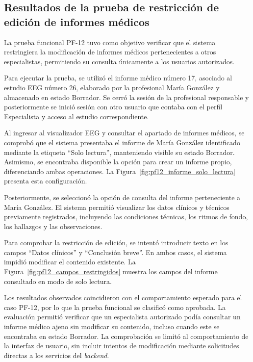 \subsection{Resultados de la prueba de restricción de edición de informes médicos}

La prueba funcional PF-12 tuvo como objetivo verificar que el sistema restringiera la modificación de informes médicos pertenecientes a otros especialistas, permitiendo su consulta únicamente a los usuarios autorizados.

Para ejecutar la prueba, se utilizó el informe médico número 17, asociado al estudio EEG número 26, elaborado por la profesional María González y almacenado en estado Borrador. Se cerró la sesión de la profesional responsable y posteriormente se inició sesión con otro usuario que contaba con el perfil Especialista y acceso al estudio correspondiente.

Al ingresar al visualizador EEG y consultar el apartado de informes médicos, se comprobó que el sistema presentaba el informe de María González identificado mediante la etiqueta ``Solo lectura'', manteniendo visible su estado Borrador. Asimismo, se encontraba disponible la opción para crear un informe propio, diferenciando ambas operaciones. La Figura~\ref{fig:pf12_informe_solo_lectura} presenta esta configuración.

Posteriormente, se seleccionó la opción de consulta del informe perteneciente a María González. El sistema permitió visualizar los datos clínicos y técnicos previamente registrados, incluyendo las condiciones técnicas, los ritmos de fondo, los hallazgos y las observaciones.

Para comprobar la restricción de edición, se intentó introducir texto en los campos ``Datos clínicos'' y ``Conclusión breve''. En ambos casos, el sistema impidió modificar el contenido existente. La Figura~\ref{fig:pf12_campos_restringidos} muestra los campos del informe consultado en modo de solo lectura.

Los resultados observados coincidieron con el comportamiento esperado para el caso PF-12, por lo que la prueba funcional se clasificó como aprobada. La evaluación permitió verificar que un especialista autorizado podía consultar un informe médico ajeno sin modificar su contenido, incluso cuando este se encontraba en estado Borrador. La comprobación se limitó al comportamiento de la interfaz de usuario, sin incluir intentos de modificación mediante solicitudes directas a los servicios del \textit{backend}.


